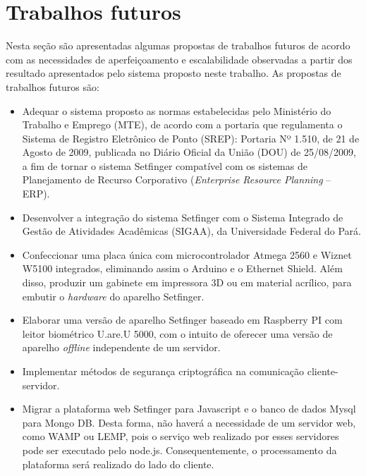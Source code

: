 \section{Trabalhos futuros\label{cap:trabalhos_futuros}}


Nesta seção são apresentadas algumas propostas de trabalhos futuros de acordo com as necessidades de aperfeiçoamento e escalabilidade observadas a partir dos resultado apresentados pelo sistema proposto neste trabalho. As propostas de trabalhos futuros são:

\begin{itemize}
    
    \item Adequar o sistema proposto as normas estabelecidas pelo Ministério do Trabalho e Emprego (MTE), de acordo com a portaria que regulamenta o Sistema de Registro Eletrônico de Ponto (SREP): Portaria Nº 1.510, de 21 de Agosto de 2009, publicada no Diário Oficial da União (DOU) de 25/08/2009, a fim de tornar o sistema Setfinger compatível com os sistemas de Planejamento de Recurso Corporativo (\textit{Enterprise Resource Planning} -- ERP).
    
    
    \item Desenvolver a integração do sistema Setfinger com o Sistema Integrado de Gestão de Atividades Acadêmicas (SIGAA), da Universidade Federal do Pará.
    
    
    \item Confeccionar uma placa única com microcontrolador Atmega 2560 e Wiznet W5100 integrados, eliminando assim o Arduino e o Ethernet Shield. Além disso, produzir um gabinete em impressora 3D ou em material acrílico, para embutir o \textit{hardware} do aparelho Setfinger. 
    
    \item Elaborar uma versão de aparelho Setfinger baseado em Raspberry PI com leitor biométrico U.are.U 5000, com o intuito de oferecer uma versão de aparelho \textit{offline} independente de um servidor.
    
    \item Implementar métodos de segurança criptográfica na comunicação cliente-servidor.

    \item Migrar a plataforma web Setfinger para Javascript e o banco de dados Mysql para Mongo DB. Desta forma, não haverá a necessidade de um servidor web, como WAMP ou LEMP, pois o serviço web realizado por esses servidores pode ser executado pelo node.js. Consequentemente, o processamento da plataforma será realizado do lado do cliente.


\end{itemize}